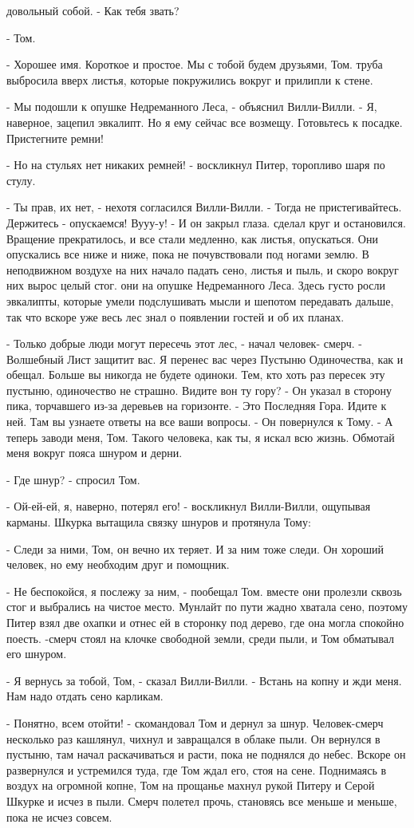 довольный собой. - Как тебя звать?
\par- Том.
\par- Хорошее имя. Короткое и простое. Мы с тобой будем друзьями, Том.
 труба выбросила вверх листья, которые покружились 
вокруг и прилипли к стене.
\par- Мы подошли к опушке Недреманного Леса, - объяснил Вилли-Вилли. - 
Я, наверное, зацепил эвкалипт. Но я ему сейчас все возмещу. Готовьтесь 
к посадке. Пристегните ремни!
\par- Но на стульях нет никаких ремней! - воскликнул Питер, торопливо 
шаря по стулу.
\par- Ты прав, их нет, - нехотя согласился Вилли-Вилли. - Тогда не 
пристегивайтесь. Держитесь - опускаемся! Вууу-у! - И он закрыл глаза.
 сделал круг и остановился. Вращение прекратилось, и все 
стали медленно, как листья, опускаться. Они опускались все ниже и 
ниже, пока не почувствовали под ногами землю. В неподвижном воздухе на 
них начало падать сено, листья и пыль, и скоро вокруг них вырос целый 
стог.
 они на опушке Недреманного Леса. Здесь густо росли 
эвкалипты, которые умели подслушивать мысли и шепотом передавать 
дальше, так что вскоре уже весь лес знал о появлении гостей и об их 
планах.
\par- Только добрые люди могут пересечь этот лес, - начал человек-
смерч. - Волшебный Лист защитит вас. Я перенес вас через Пустыню 
Одиночества, как и обещал. Больше вы никогда не будете одиноки. Тем, 
кто хоть раз пересек эту пустыню, одиночество не страшно. Видите вон 
ту гору? - Он указал в сторону пика, торчавшего из-за деревьев на 
горизонте. - Это Последняя Гора. Идите к ней. Там вы узнаете ответы на 
все ваши вопросы. - Он повернулся к Тому. - А теперь заводи меня, Том. 
Такого человека, как ты, я искал всю жизнь. Обмотай меня вокруг пояса 
шнуром и дерни.
\par- Где шнур? - спросил Том.
\par- Ой-ей-ей, я, наверно, потерял его! - воскликнул Вилли-Вилли, 
ощупывая карманы.
 Шкурка вытащила связку шнуров и протянула Тому:
\par- Следи за ними, Том, он вечно их теряет. И за ним тоже следи. Он 
хороший человек, но ему необходим друг и помощник.
\par- Не беспокойся, я послежу за ним, - пообещал Том.
 вместе они пролезли сквозь стог и выбрались на чистое место. 
Мунлайт по пути жадно хватала сено, поэтому Питер взял две охапки и 
отнес ей в сторонку под дерево, где она могла спокойно поесть.
-смерч стоял на клочке свободной земли, среди пыли, и Том 
обматывал его шнуром.
\par- Я вернусь за тобой, Том, - сказал Вилли-Вилли. - Встань на копну 
и жди меня. Нам надо отдать сено карликам.
\par- Понятно, всем отойти! - скомандовал Том и дернул за шнур. 
Человек-смерч несколько раз кашлянул, чихнул и завращался в облаке 
пыли. Он вернулся в пустыню, там начал раскачиваться и расти, пока не 
поднялся до небес. Вскоре он развернулся и устремился туда, где Том 
ждал его, стоя на сене. Поднимаясь в воздух на огромной копне, Том на 
прощанье махнул рукой Питеру и Серой Шкурке и исчез в пыли. Смерч 
полетел прочь, становясь все меньше и меньше, пока не исчез совсем.
